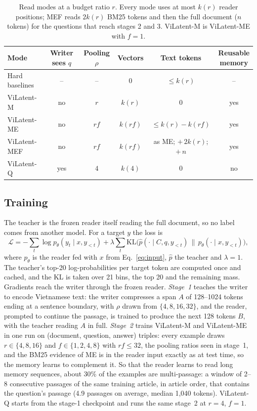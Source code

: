 \begin{table}[t]
\caption{Read modes at a budget ratio $r$. Every mode uses at most $k(r)$ reader positions; MEF reads $2k(r)$ BM25 tokens and then the full document ($n$ tokens) for the questions that reach stages 2 and 3. ViLatent-M is ViLatent-ME with $f = 1$.}
\label{tab:modes}
\centering\small
\setlength{\tabcolsep}{5pt}
\begin{tabular}{@{}lccccc@{}}
\toprule
Mode & \shortstack{Writer\\sees $q$} & \shortstack{Pooling\\$\rho$} & Vectors & Text tokens & \shortstack{Reusable\\memory} \\
\midrule
Hard baselines & -- & -- & 0 & $\le k(r)$ & -- \\
ViLatent-M & no & $r$ & $k(r)$ & 0 & yes \\
ViLatent-ME & no & $rf$ & $k(rf)$ & $\le k(r) - k(rf)$ & yes \\
ViLatent-MEF & no & $rf$ & $k(rf)$ & as ME; $+\,2k(r)$; $+\,n$ & yes \\
ViLatent-Q & yes & $4$ & $k(4)$ & 0 & no \\
\bottomrule
\end{tabular}
\end{table}

\subsection{Training}
\label{sec:training}
The teacher is the frozen reader itself reading the full document, so no label comes from another model.
For a target $y$ the loss is
\begin{equation}
\mathcal{L} = -\sum_t \log p_\theta(y_t \mid x, y_{<t}) + \lambda \sum_t \mathrm{KL}\big(\hat p(\cdot \mid C, q, y_{<t}) \,\big\|\, p_\theta(\cdot \mid x, y_{<t})\big),
\label{eq:loss}
\end{equation}
where $p_\theta$ is the reader fed with $x$ from Eq.~\eqref{eq:input}, $\hat p$ the teacher and $\lambda = 1$.
The teacher's top-20 log-probabilities per target token are computed once and cached, and the KL is taken over 21 bins, the top 20 and the remaining mass.
Gradients reach the writer through the frozen reader.
\emph{Stage~1} teaches the writer to encode Vietnamese text: the writer compresses a span $A$ of 128--1024 tokens ending at a sentence boundary, with $\rho$ drawn from $\{4, 8, 16, 32\}$, and the reader, prompted to continue the passage, is trained to produce the next 128 tokens $B$, with the teacher reading $A$ in full.
\emph{Stage~2} trains ViLatent-M and ViLatent-ME in one run on (document, question, answer) triples: every example draws $r \in \{4, 8, 16\}$ and $f \in \{1, 2, 4, 8\}$ with $rf \le 32$, the pooling ratios seen in stage~1, and the BM25 evidence of ME is in the reader input exactly as at test time, so the memory learns to complement it.
So that the reader learns to read long memory sequences, about 30\% of the examples are multi-passage: a window of 2--8 consecutive passages of the same training article, in article order, that contains the question's passage (4.9 passages on average, median 1,040 tokens).
ViLatent-Q starts from the stage-1 checkpoint and runs the same stage~2 at $r = 4$, $f = 1$.
